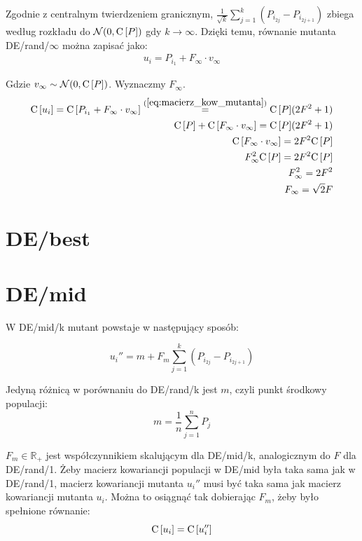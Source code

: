 \documentclass[a4paper,onecolumn,oneside,11pt,wide,floatssmall]{mwrep}
\def\C{{\rm C}\,}
\theoremstyle{definition}
\theoremstyle{plain}%
\theoremstyle{remark}
\begin{document}
Zgodnie z centralnym twierdzeniem granicznym, $\frac{1}{{\sqrt{k}}}\sum\limits_{j=1}^k (P_{i_{2j}} - P_{i_{2j+1}})$ 
zbiega według rozkładu do $\mathcal{N}(0, \C[P])$ gdy $k \to \infty$. 
Dzięki temu, równanie mutanta DE/rand/$\infty$ można zapisać jako:
\begin{align*}
u_i = P_{i_1} + F_\infty \cdot v_\infty
\end{align*}

Gdzie $v_\infty \sim \mathcal{N}(0, \C[P])$. Wyznaczmy $F_\infty$.
\begin{align*}
\C[u_i] = \C[P_{i_1} + F_\infty \cdot v_\infty] \overset{(\ref{eq:macierz_kow_mutanta})}{=} \C[P](2F^2 + 1) \\
\C[P] + \C[F_\infty \cdot v_\infty] = \C[P](2F^2 + 1) \\
\C[F_\infty \cdot v_\infty] = 2F^2\C[P] \\
F_\infty^2 \C[P] = 2F^2\C[P] \\
F_\infty^2 = 2F^2 \\
F_\infty = \sqrt{2}F
\end{align*}

\section{DE/best}

\section{DE/mid}

W DE/mid/k mutant powstaje w następujący sposób:

\begin{equation} \label{eq:demid}
u_i'' = m + F_m\sum\limits_{j=1}^k (P_{i_{2j}} - P_{i_{2j+1}})
\end{equation}

Jedyną różnicą w porównaniu do DE/rand/k jest $m$, czyli punkt środkowy populacji:
\begin{equation} \label{eq:midpoint}
m = \frac{1}{n}\sum\limits_{j=1}^n P_j
\end{equation}

$F_m\in\mathbb{R_+}$ jest współczynnikiem skalującym dla DE/mid/k, analogicznym do $F$ dla DE/rand/1. 
Żeby macierz kowariancji populacji w DE/mid była taka sama jak w DE/rand/1, 
macierz kowariancji mutanta $u_i''$ musi być taka sama jak macierz kowariancji mutanta $u_i$.
Można to osiągnąć tak dobierając $F_m$, żeby było spełnione równanie:
\begin{equation} \label{eq:rownanie}
\C[u_i] = \C[u_i'']
\end{equation}
\end{document}
